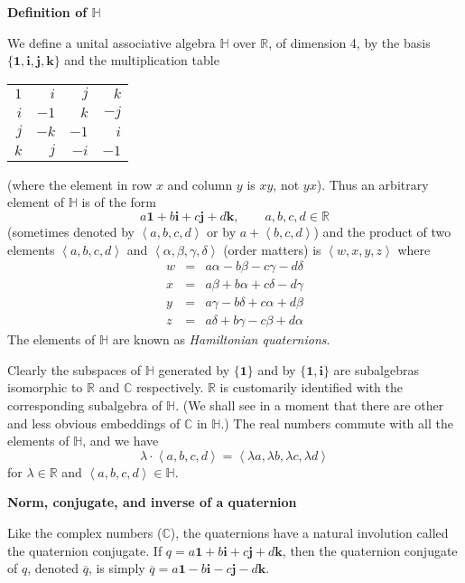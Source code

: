\documentclass[12pt]{article}
\begin{document}
\newcommand{\R}{\mathbb{R}}
\newcommand{\C}{\mathbb{C}}
\newcommand{\Q}{\mathbb{H}}

\noindent
\textbf{Definition of $\Q$}

We define a unital associative algebra $\Q$ over $\R$, of dimension 4,
by the basis $\{\mathbf{1},\mathbf{i},\mathbf{j},\mathbf{k}\}$ and
the multiplication table
\begin{center}\begin{tabular}{rrrr}
$1$ & $i$ & $j$ & $k$ \\
$i$ & $-1$ & $k$ & $-j$ \\
$j$ & $-k$ & $-1$ & $i$ \\
$k$ & $j$ & $-i$ & $-1$
\end{tabular}\end{center}
(where the element in row $x$ and column $y$ is $xy$, not $yx$).
Thus an arbitrary element of $\Q$ is of the form
$$ a\mathbf{1} + b\mathbf{i} + c\mathbf{j} + d\mathbf{k},
\qquad a,b,c,d \in \R$$
(sometimes denoted by $\left< a, b, c, d\right>$
or by $a + \left<b,c,d\right>$) and the product of two elements
$\left<a,b,c,d\right>$ and $\left<\alpha,\beta,\gamma,\delta\right>$ (order matters)
is $\left<w,x,y,z\right>$ where
\begin{eqnarray*}
w&=& a\alpha - b\beta - c\gamma - d\delta \\
x&=& a\beta + b\alpha + c\delta - d\gamma \\
y&=& a\gamma - b\delta + c\alpha + d\beta \\
z&=& a\delta + b\gamma - c\beta + d\alpha
\end{eqnarray*}
The elements of $\Q$ are known as \emph{Hamiltonian quaternions}.

Clearly the subspaces of $\Q$ generated by $\{\mathbf{1}\}$
and by $\{\mathbf{1},\mathbf{i}\}$ are subalgebras isomorphic
to $\R$ and $\C$ respectively. $\R$ is customarily identified with
the corresponding subalgebra of $\Q$.
(We shall see in a moment that there are other and less obvious
embeddings of $\C$ in $\Q$.)
The real numbers commute with all the elements of $\Q$, and we have
$$\lambda \cdot \left<a,b,c,d\right>
= \left<\lambda a, \lambda b, \lambda c, \lambda d\right>$$
for $\lambda \in \R$ and $\left<a,b,c,d\right> \in \Q$.

\noindent
\textbf{Norm, conjugate, and inverse of a quaternion}

Like the complex numbers ($\C$), the quaternions have a
natural involution called the quaternion conjugate. If $q = a\mathbf{1}
+ b\mathbf{i} + c\mathbf{j} + d\mathbf{k}$, then the quaternion
conjugate of $q$, denoted $\overline{q}$, is simply $\overline{q}
= a\mathbf{1} - b\mathbf{i} - c\mathbf{j} - d\mathbf{k}$.
\end{document}
